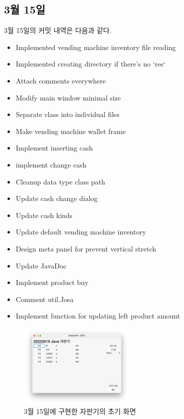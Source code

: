 \documentclass{oblivoir}
\begin{document}
    \subsection{3월 15일}

    3월 15일의 커밋 내역은 다음과 같다.
    \begin{itemize}
        \item Implemented vending machine inventory file reading
        \item Implemented creating directory if there's no `res`
        \item Attach comments everywhere
        \item Modify main window minimal size
        \item Separate class into individual files
        \item Make vending machine wallet frame
        \item Implement inserting cash
        \item implement change cash
        \item Cleanup data type class path
        \item Update cash change dialog
        \item Update cash kinds
        \item Update default vending machine inventory
        \item Design meta panel for prevent vertical stretch
        \item Update JavaDoc
        \item Implement product buy
        \item Comment util.Josa
        \item Implement function for updating left product amount
    \end{itemize}

    \begin{figure}[h]
        \centering
        \includegraphics[width=0.5\textwidth]{0315-vending-machine}
        \caption{3월 15일에 구현한 자판기의 초기 화면}
        \label{fig:0315-vending-machine}
    \end{figure}
\end{document}
